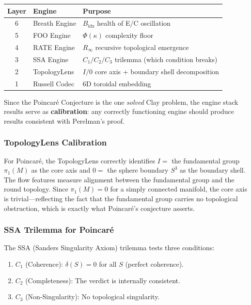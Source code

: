 \documentclass[11pt]{article}
\begin{document}
\begin{center}
\begin{tabular}{@{}clp{6.5cm}@{}}
\toprule
Layer & Engine & Purpose \\
\midrule
6 & Breath Engine & $B_{\mathrm{idx}}$ health of E/C oscillation \\
5 & FOO Engine & $\Phi(\kappa)$ complexity floor \\
4 & RATE Engine & $R_\infty$ recursive topological emergence \\
3 & SSA Engine & $C_1/C_2/C_3$ trilemma (which condition breaks) \\
2 & TopologyLens & $I/0$ core axis + boundary shell decomposition \\
1 & Russell Codec & 6D toroidal embedding \\
\bottomrule
\end{tabular}
\end{center}

\noindent
Since the Poincar\'e Conjecture is the one \emph{solved} Clay problem, the engine
stack results serve as \textbf{calibration}: any correctly functioning engine should
produce results consistent with Perelman's proof.

\subsubsection{TopologyLens Calibration}

For Poincar\'e, the TopologyLens correctly identifies $I =$ the fundamental group
$\pi_1(M)$ as the core axis and $0 =$ the sphere boundary $S^3$ as the boundary
shell.  The flow features measure alignment between the fundamental group and the
round topology.  Since $\pi_1(M) = 0$ for a simply connected manifold, the
core axis is trivial---reflecting the fact that the fundamental group carries no
topological obstruction, which is exactly what Poincar\'e's conjecture asserts.

\subsubsection{SSA Trilemma for Poincar\'e}

The SSA (Sanders Singularity Axiom) trilemma tests three conditions:
\begin{enumerate}
\item $C_1$ (Coherence): $\delta(S) = 0$ for all $S$ (perfect coherence).
\item $C_2$ (Completeness): The verdict is internally consistent.
\item $C_3$ (Non-Singularity): No topological singularity.
\end{enumerate}
\end{document}
